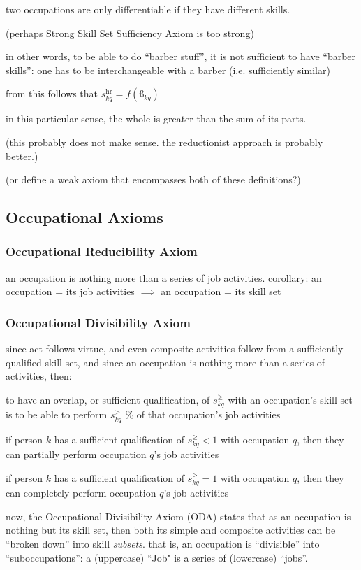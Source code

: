 \documentclass{elsarticle} %
\begin{document}
two occupations are only differentiable if they have different skills.

(perhaps Strong Skill Set Sufficiency Axiom is too strong)

in other words, to be able to do ``barber stuff'', it is not sufficient to have
``barber skills'': one has to be interchangeable with a barber (i.e.
sufficiently similar)

from this follows that $s_{kq}^{\text{hr}} = f(\textit{\ss}_{kq})$

in this particular sense, the whole is greater than the sum of its parts.

(this probably does not make sense. the reductionist approach is probably better.)

(or define a weak axiom that encompasses both of these definitions?)

\subsection{Occupational Axioms}
\subsubsection{Occupational Reducibility Axiom}
an occupation is nothing more than a series of job activities. corollary: an
occupation = its job activities $\implies$ an occupation = its skill set

\subsubsection{Occupational Divisibility Axiom}
since act follows virtue, and even composite activities follow from a
sufficiently qualified skill set, and since an occupation is nothing more than
a series of activities, then:

to have an overlap, or sufficient qualification, of $s_{kq}^{\geq}$ with an
occupation's skill set is to be able to perform $s_{kq}^{\geq}$ \% of that
occupation's job activities

if person $k$ has a sufficient qualification of $s_{kq}^{\geq} < 1$ with
occupation $q$, then they can partially perform occupation $q$'s job activities

if person $k$ has a sufficient qualification of $s_{kq}^{\geq} = 1$ with
occupation $q$, then they can completely perform occupation $q$'s job
activities

now, the Occupational Divisibility Axiom (ODA) states that as an occupation is
nothing but its skill set, then both its simple and composite activities can be
``broken down'' into skill \textit{subsets}. that is, an occupation is
``divisible'' into ``suboccupations'': a (uppercase) ``Job" is a series of
(lowercase) ``jobs''.
\end{document}
